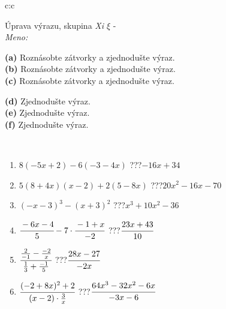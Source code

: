 \documentclass[10pt]{report}
\begin{document}
\newpage
\thispagestyle{empty}
\begin{tabular}{c:c}
\begin{minipage}[c][104.5mm][t]{0.5\linewidth}
\begin{center}
\vspace{7mm}
{\huge Úprava výrazu, skupina \textit{Xi $\xi$} -}\\[5mm]
\textit{Meno:}\phantom{xxxxxxxxxxxxxxxxxxxxxxxxxxxxxxxxxxxxxxxxxxxxxxxxxxxxxxxxxxxxxxxxx}\\[5mm]
\begin{minipage}{0.95\linewidth}
\begin{center}
{\small \begin{minipage}{0.6\textwidth}
\textbf{(a)} Roznásobte zátvorky a zjednodušte výraz. \\[1mm]
\textbf{(b)} Roznásobte zátvorky a zjednodušte výraz. \\[1mm]
\textbf{(c)} Roznásobte zátvorky a zjednodušte výraz.
\end{minipage} \begin{minipage}{0.39\textwidth}
\textbf{(d)} Zjednodušte výraz. \\[1mm]
\textbf{(e)} Zjednodušte výraz. \\[1mm]
\textbf{(f)} Zjednodušte výraz.
\end{minipage}
}
\end{center}
\end{minipage}
\\[4mm]
\begin{minipage}{0.79\linewidth}
\begin{center}
\begin{varwidth}{\linewidth}
\begin{enumerate}
\normalsize
\item $8(-5x+2)-6(-3-4x)$\quad \dotfill\; ???\;\dotfill \quad $-16x+34$
\item $5(8+4x)(x-2)+2(5-8x)$\quad \dotfill\; ???\;\dotfill \quad $20x^2-16x-70$
\item $(-x-3)^3-(x+3)^2$\quad \dotfill\; ???\;\dotfill \quad $x^3+10x^2-36$
\item $\cfrac{-6x-4}{5}-7\cdot\cfrac{-1+x}{-2}$\quad \dotfill\; ???\;\dotfill \quad $\cfrac{23x+43}{10}$
\item $\cfrac{\frac{2}{-1}-\frac{-2}{x}}{\frac{1}{3}+\frac{-1}{5}}$\quad \dotfill\; ???\;\dotfill \quad $\cfrac{28x-27}{-2x}$
\item $\cfrac{(-2+8x)^2+2}{(x-2)\cdot\frac{3}{x}}$\quad \dotfill\; ???\;\dotfill \quad $\cfrac{64x^3-32x^2-6x}{-3x-6}$

\end{enumerate}
\end{varwidth}
\end{center}
\end{minipage}
\end{center}
\end{minipage}
\end{tabular}
\end{document}
